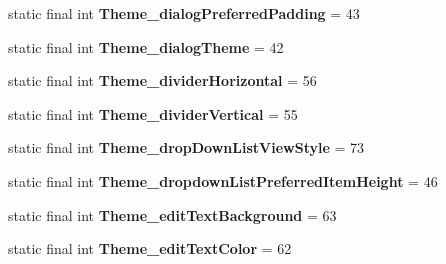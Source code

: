 \begin{DoxyCompactItemize}
\item 
\hypertarget{classandroid_1_1support_1_1design_1_1_r_1_1styleable_ad9499d3563eacaa89dd3c774fe914659}{}static final int {\bfseries Theme\+\_\+dialog\+Preferred\+Padding} = 43\label{classandroid_1_1support_1_1design_1_1_r_1_1styleable_ad9499d3563eacaa89dd3c774fe914659}

\item 
\hypertarget{classandroid_1_1support_1_1design_1_1_r_1_1styleable_a4e814e43dc484e65bfa6f735ee853c67}{}static final int {\bfseries Theme\+\_\+dialog\+Theme} = 42\label{classandroid_1_1support_1_1design_1_1_r_1_1styleable_a4e814e43dc484e65bfa6f735ee853c67}

\item 
\hypertarget{classandroid_1_1support_1_1design_1_1_r_1_1styleable_aece0d7dab4cf121551f72d9ad145745e}{}static final int {\bfseries Theme\+\_\+divider\+Horizontal} = 56\label{classandroid_1_1support_1_1design_1_1_r_1_1styleable_aece0d7dab4cf121551f72d9ad145745e}

\item 
\hypertarget{classandroid_1_1support_1_1design_1_1_r_1_1styleable_a63087d35397f54e4a42318ab2a4dc6a1}{}static final int {\bfseries Theme\+\_\+divider\+Vertical} = 55\label{classandroid_1_1support_1_1design_1_1_r_1_1styleable_a63087d35397f54e4a42318ab2a4dc6a1}

\item 
\hypertarget{classandroid_1_1support_1_1design_1_1_r_1_1styleable_a668c85426da134d17d45da18fc4c0646}{}static final int {\bfseries Theme\+\_\+drop\+Down\+List\+View\+Style} = 73\label{classandroid_1_1support_1_1design_1_1_r_1_1styleable_a668c85426da134d17d45da18fc4c0646}

\item 
\hypertarget{classandroid_1_1support_1_1design_1_1_r_1_1styleable_a78f8d553993745fd7aab512557138960}{}static final int {\bfseries Theme\+\_\+dropdown\+List\+Preferred\+Item\+Height} = 46\label{classandroid_1_1support_1_1design_1_1_r_1_1styleable_a78f8d553993745fd7aab512557138960}

\item 
\hypertarget{classandroid_1_1support_1_1design_1_1_r_1_1styleable_a6939755f6df332be65e7d2568913e209}{}static final int {\bfseries Theme\+\_\+edit\+Text\+Background} = 63\label{classandroid_1_1support_1_1design_1_1_r_1_1styleable_a6939755f6df332be65e7d2568913e209}

\item 
\hypertarget{classandroid_1_1support_1_1design_1_1_r_1_1styleable_a360466ae04595ecca8ec334d6dcaa6c9}{}static final int {\bfseries Theme\+\_\+edit\+Text\+Color} = 62\label{classandroid_1_1support_1_1design_1_1_r_1_1styleable_a360466ae04595ecca8ec334d6dcaa6c9}


\end{DoxyCompactItemize}
